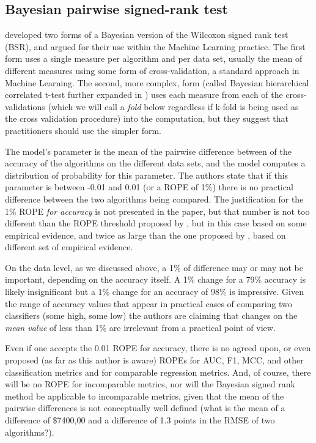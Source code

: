 \documentclass[twoside,11pt,preprint]{article}
\begin{document}
\hypertarget{bayesian-pairwise-signed-rank-test}{%
\subsection{\texorpdfstring{Bayesian pairwise signed-rank test \label{sec:bsr}}{Bayesian pairwise signed-rank test }}\label{bayesian-pairwise-signed-rank-test}}

\citet{benavoli2017time} developed two forms of a Bayesian version of the
Wilcoxon signed rank test (BSR), and argued for their use within the
Machine Learning practice. The first form uses a single measure per
algorithm and per data set, usually the mean of different measures
using some form of cross-validation, a standard approach in
Machine Learning. The second, more complex, form (called Bayesian
hierarchical correlated t-test further expanded in \citet{corani2017statistical}) uses each measure from each of the
cross-validations (which we will call a \emph{fold} below regardless if
k-fold is being used as the cross validation procedure) into the
computation, but they suggest that practitioners should use the
simpler form.

The model's parameter is the mean of the pairwise difference between
of the accuracy of the algorithms on the different data sets, and the model
computes a distribution of probability for this parameter. The authors state
that if this parameter is between -0.01 and 0.01 (or a ROPE of 1\%)
there is no practical difference between the two algorithms being
compared. The justification for the 1\% ROPE \emph{for accuracy} is not
presented in the paper, but that number is not too different than the
ROPE threshold proposed by \citet{wainer2016}, but in this case based on some
empirical evidence, and twice as large than the one proposed by
\citet{WAINER2021115222}, based on different set of empirical evidence.

On the data level, as we discussed above, a 1\% of difference may or
may not be important, depending on the accuracy itself. A 1\% change for a
79\% accuracy is likely insignificant but a 1\% change for an accuracy
of 98\% is impressive. Given the range of accuracy values that appear
in practical cases of comparing two classifiers (some high, some low)
the authors are claiming that changes on the \emph{mean value} of less than
1\% are irrelevant from a practical point of view.

Even if one accepts the 0.01 ROPE for accuracy, there is no agreed
upon, or even proposed (as far as this author is aware) ROPEs for AUC,
F1, MCC, and other classification metrics and for comparable
regression metrics. And, of course, there will be no ROPE for
incomparable metrics, nor will the Bayesian signed rank method be
applicable to incomparable metrics, given that the mean of the
pairwise differences is not conceptually well defined (what is the
mean of a difference of \$7400,00 and a difference of 1.3 points in the
RMSE of two algorithms?).
\end{document}
